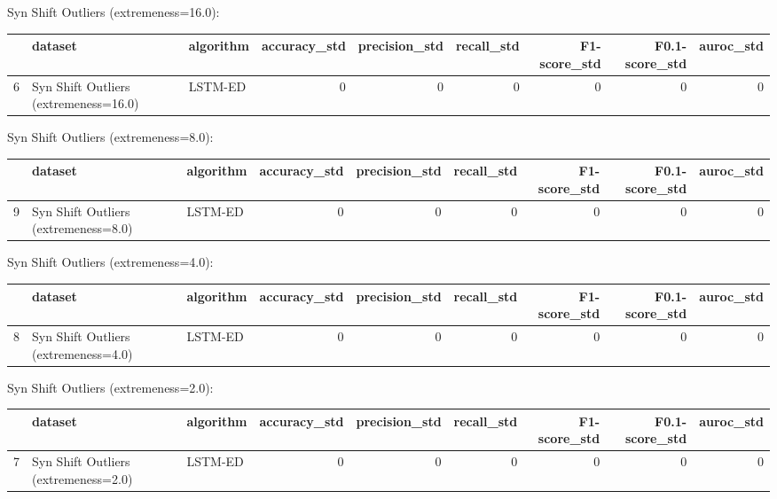 Syn Shift Outliers (extremeness=16.0):

\begin{tabular}{rllrrrrrr}
\hline
    & dataset                               & algorithm   &   accuracy\_std &   precision\_std &   recall\_std &   F1-score\_std &   F0.1-score\_std &   auroc\_std \\
\hline
  6 & Syn Shift Outliers (extremeness=16.0) & LSTM-ED     &              0 &               0 &            0 &              0 &                0 &           0 \\
\hline
\end{tabular}

Syn Shift Outliers (extremeness=8.0):

\begin{tabular}{rllrrrrrr}
\hline
    & dataset                              & algorithm   &   accuracy\_std &   precision\_std &   recall\_std &   F1-score\_std &   F0.1-score\_std &   auroc\_std \\
\hline
  9 & Syn Shift Outliers (extremeness=8.0) & LSTM-ED     &              0 &               0 &            0 &              0 &                0 &           0 \\
\hline
\end{tabular}

Syn Shift Outliers (extremeness=4.0):

\begin{tabular}{rllrrrrrr}
\hline
    & dataset                              & algorithm   &   accuracy\_std &   precision\_std &   recall\_std &   F1-score\_std &   F0.1-score\_std &   auroc\_std \\
\hline
  8 & Syn Shift Outliers (extremeness=4.0) & LSTM-ED     &              0 &               0 &            0 &              0 &                0 &           0 \\
\hline
\end{tabular}

Syn Shift Outliers (extremeness=2.0):

\begin{tabular}{rllrrrrrr}
\hline
    & dataset                              & algorithm   &   accuracy\_std &   precision\_std &   recall\_std &   F1-score\_std &   F0.1-score\_std &   auroc\_std \\
\hline
  7 & Syn Shift Outliers (extremeness=2.0) & LSTM-ED     &              0 &               0 &            0 &              0 &                0 &           0 \\
\hline
\end{tabular}

